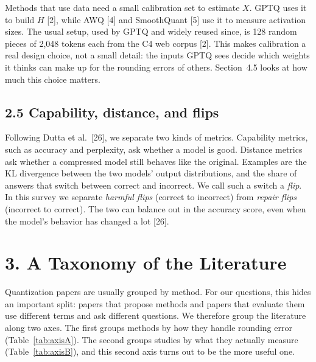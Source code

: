 \documentclass[10pt,twocolumn]{article}
\begin{document}
Methods that use data need a small calibration set to estimate $X$.
GPTQ uses it to build $H$ [2], while AWQ [4] and SmoothQuant [5] use it
to measure activation sizes. The usual setup, used by GPTQ and widely
reused since, is 128 random pieces of 2,048 tokens each from the C4 web
corpus [2]. This makes calibration a real design choice, not a small
detail: the inputs GPTQ sees decide which weights it thinks can make up
for the rounding errors of others. Section~4.5 looks at how much this
choice matters.

\subsection{2.5 Capability, distance, and flips}

Following Dutta et al.~[26], we separate two kinds of metrics.
Capability metrics, such as accuracy and perplexity, ask whether a model
is good. Distance metrics ask whether a compressed model still behaves
like the original. Examples are the KL divergence between the two
models' output distributions, and the share of answers that switch
between correct and incorrect. We call such a switch a \emph{flip}. In
this survey we separate \emph{harmful flips} (correct to incorrect) from
\emph{repair flips} (incorrect to correct). The two can balance out in
the accuracy score, even when the model's behavior has changed a lot
[26].

\section{3. A Taxonomy of the Literature}

Quantization papers are usually grouped by method. For our questions,
this hides an important split: papers that propose methods and papers
that evaluate them use different terms and ask different questions. We
therefore group the literature along two axes. The first groups methods
by how they handle rounding error (Table~\ref{tab:axisA}). The second
groups studies by what they actually measure (Table~\ref{tab:axisB}),
and this second axis turns out to be the more useful one.
\end{document}
